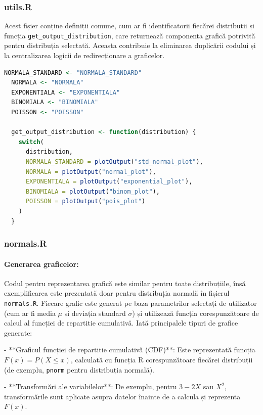 \documentclass[a4paper,11pt]{article}
\begin{document}
\subsubsection*{utils.R}

Acest fișier conține definiții comune, cum ar fi identificatorii fiecărei distribuții și funcția \texttt{get\_output\_distribution}, care returnează componenta grafică potrivită pentru distribuția selectată. Aceasta contribuie la eliminarea duplicării codului și la centralizarea logicii de redirecționare a graficelor.

\begin{lstlisting}[language=R]
  NORMALA_STANDARD <- "NORMALA_STANDARD"
  NORMALA <- "NORMALA"
  EXPONENTIALA <- "EXPONENTIALA"
  BINOMIALA <- "BINOMIALA"
  POISSON <- "POISSON"
  
  get_output_distribution <- function(distribution) {
    switch(
      distribution,
      NORMALA_STANDARD = plotOutput("std_normal_plot"),
      NORMALA = plotOutput("normal_plot"),
      EXPONENTIALA = plotOutput("exponential_plot"),
      BINOMIALA = plotOutput("binom_plot"),
      POISSON = plotOutput("pois_plot")
    )
  }
\end{lstlisting}

\subsubsection*{normals.R}

\paragraph{Generarea graficelor:}  
Codul pentru reprezentarea grafică este similar pentru toate distribuțiile, însă exemplificarea este prezentată doar pentru distribuția normală în fișierul \texttt{normals.R}.  
Fiecare grafic este generat pe baza parametrilor selectați de utilizator (cum ar fi media \(\mu\) și deviația standard \(\sigma\)) și utilizează funcția corespunzătoare de calcul al funcției de repartitie cumulativă. Iată principalele tipuri de grafice generate:

- **Graficul funcției de repartitie cumulativă (CDF)**: Este reprezentată funcția \( F(x) = P(X \leq x) \), calculată cu funcția R corespunzătoare fiecărei distribuții (de exemplu, \texttt{pnorm} pentru distribuția normală).
  
- **Transformări ale variabilelor**: De exemplu, pentru \( 3 - 2X \) sau \( X^2 \), transformările sunt aplicate asupra datelor înainte de a calcula și reprezenta \( F(x) \).
  
\end{document}
